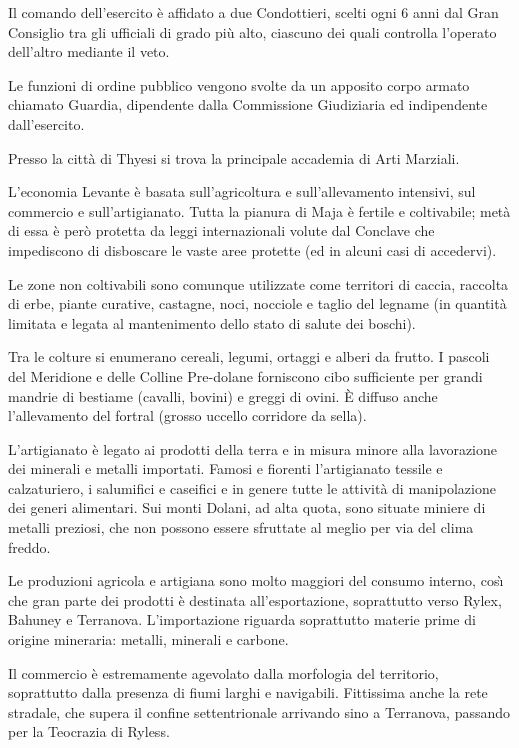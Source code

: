 Il comando dell'esercito \`e affidato a due Condottieri, scelti ogni 6
anni dal Gran Consiglio tra gli ufficiali di grado pi\`u alto,
ciascuno dei quali controlla l'operato dell'altro mediante il veto.

Le funzioni di ordine pubblico vengono svolte da un apposito corpo
armato chiamato Guardia, dipendente dalla Commissione Giudiziaria ed
indipendente dall'esercito.

Presso la citt\`a di Thyesi si trova la principale accademia di Arti
Marziali.
\fi


\Economia L'economia Levante \`e basata sull'agricoltura e
sull'allevamento intensivi, sul commercio e sull'artigianato. Tutta la
pianura di Maja \`e fertile e coltivabile; met\`a di essa \`e per\`o
protetta da leggi internazionali volute dal Conclave che impediscono
di disboscare le vaste aree protette (ed in alcuni casi di accedervi).

\iffullversion
Le zone non coltivabili sono comunque utilizzate come territori di
caccia, raccolta di erbe, piante curative, castagne, noci, nocciole e
taglio del legname (in quantit\`a limitata e legata al mantenimento
dello stato di salute dei boschi).

Tra le colture si enumerano cereali, legumi, ortaggi e alberi da
frutto. I pascoli del Meridione e delle Colline Pre-dolane forniscono
cibo sufficiente per grandi mandrie di bestiame (cavalli, bovini) e
greggi di ovini. \`E diffuso anche l'allevamento del fortral (grosso
uccello corridore da sella).

L'artigianato \`e legato ai prodotti della terra e in misura minore
alla lavorazione dei minerali e metalli importati.  Famosi e fiorenti
l'artigianato tessile e calzaturiero, i salumifici e caseifici e in
genere tutte le attivit\`a di manipolazione dei generi alimentari. Sui
monti Dolani, ad alta quota, sono situate miniere di metalli preziosi,
che non possono essere sfruttate al meglio per via del clima freddo.

Le produzioni agricola e artigiana sono molto maggiori del consumo
interno, cos\`{\i}  che gran parte dei prodotti \`e destinata
all'esportazione, soprattutto verso Rylex, Bahuney e Terranova.
L'importazione riguarda soprattutto materie prime di origine
mineraria: metalli, minerali e carbone.
\fi

Il commercio \`e estremamente agevolato dalla morfologia del
territorio, soprattutto dalla presenza di fiumi larghi e navigabili.
Fittissima anche la rete stradale, che supera il confine
settentrionale arrivando sino a Terranova, passando per la Teocrazia
di Ryless.

